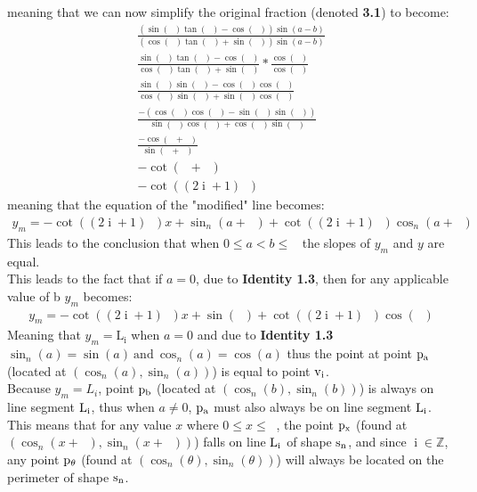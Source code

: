 \documentclass[11pt]{article}
\DeclareMathOperator{\custi}{\mathrm{i}}
\DeclareMathOperator{\period}{\frac{2\pi}{n}}
\DeclareMathOperator{\hp}{\frac{\pi}{n}}
\DeclareMathOperator{\iperiod}{\frac{2\custi\pi}{n}}
\begin{document}
meaning that we can now simplify the original fraction (denoted \textbf{3.1}) to become:
\begin{gather*}
\frac{(\sin(\iperiod)\tan(\hp)-\cos(\iperiod))\sin(a-b)}{(\cos(\iperiod)\tan(\hp)+\sin(\iperiod))\sin(a-b)}\\
\frac{\sin(\iperiod)\tan(\hp)-\cos(\iperiod)}{\cos(\iperiod)\tan(\hp)+\sin(\iperiod)} * \frac{\cos(\hp)}{\cos(\hp)}\\
\frac{\sin(\iperiod)\sin(\hp)-\cos(\iperiod)\cos(\hp)}{\cos(\iperiod)\sin(\hp)+\sin(\iperiod)\cos(\hp)}\\
\frac{-(\cos(\iperiod)\cos(\hp)-\sin(\iperiod)\sin(\hp))}{\sin(\hp)\cos(\iperiod)+\cos(\hp)\sin(\iperiod)}\\
\frac{-\cos(\iperiod+\hp)}{\sin(\iperiod+\hp)}\\
-\cot(\iperiod+\hp)\\
-\cot((2\custi+1)\hp)
\end{gather*}
meaning that the equation of the "modified" line becomes:
\begin{gather*}
y_m=-\cot((2\custi+1)\hp)x+\sin_n(a+\iperiod)+\cot((2\custi+1)\hp)\cos_n(a+\iperiod)
\end{gather*}
This leads to the conclusion that when \(0\leq a<b\leq\period\) the slopes of \(y_m\) and \(y\) are equal. \\
This leads to the fact that if \(a=0\), due to \textbf{Identity 1.3}, then for any applicable value of b \(y_m\) becomes:
\begin{gather*}
y_m=-\cot((2\custi+1)\hp)x+\sin(\iperiod)+\cot((2\custi+1)\hp)\cos(\iperiod)
\end{gather*}
Meaning that \(y_m=\mathrm{L_i}\) when \(a=0\) and due to \textbf{Identity 1.3} \(\sin_n(a)=\sin(a) \mathrm{\ and\ } \cos_n(a)=\cos(a)\) thus the point at point \(\rm p_a\) (located at \((\cos_n(a), \sin_n(a))\)) is equal to point \(\rm v_i\).\\
Because \(y_m = L_i\), point \(\rm p_b\) (located at \((\cos_n(b),\sin_n(b))\)) is always on line segment \(\rm L_i\), thus when \(a\neq0\), \(\rm p_a\) must also always be on line segment \(\rm L_i\).\\
This means that for any value \(x\) where \(0\leq x \leq\period\), the point \(\rm p_x\) (found at \((\cos_n(x+\iperiod),\sin_n(x+\iperiod))\)) falls on line \(\rm L_i\) of shape \(\rm s_n\), and since \(\custi\in\mathbb{Z}\), any point \(\rm p_\theta\) (found at \((\cos_n(\theta),\sin_n(\theta))\)) will always be located on the perimeter of shape \(\rm s_n\).
\end{document}
